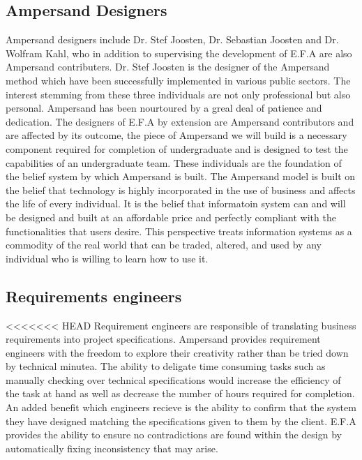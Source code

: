 \documentclass[12pt]{report}
\begin{document}
\subsection{Ampersand Designers}\label{subsec:Ampersand}
Ampersand designers include Dr. Stef Joosten, Dr. Sebastian Joosten and Dr. 
Wolfram Kahl, who in addition to supervising the development of E.F.A are also 
Ampersand contributers. Dr. Stef Joosten is the designer of the Ampersand 
method which have been successfully implemented in various public sectors. The 
interest stemming from these three individuals are not only professional but 
also personal. Ampersand has been nourtoured by a greal deal of patience and 
dedication. The designers of E.F.A by extension are Ampersand contributors and 
are affected by its outcome, the piece of Ampersand we will build is a 
necessary component required for completion of undergraduate and is designed to 
test the capabilities of an undergraduate team. 
These individuals are the foundation of the belief system by which Ampersand is 
built. The Ampersand model is built on the belief that technology is highly 
incorporated in the use of business and affects the life of every individual. 
It is the belief that informatoin system can and will be designed and built at 
an affordable price and perfectly compliant with the functionalities that users 
desire. This perspective treats information systems as a commodity of the real 
world that can be traded, altered, and used by any individual who is willing to 
learn how to use it.
\subsection{Requirements engineers}\label{subsec:BusReq}
<<<<<<< HEAD
Requirement engineers are responsible of translating business 
requirements into project specifications. Ampersand provides requirement 
engineers with the freedom to explore their creativity rather than be tried 
down by technical minutea. The ability to deligate time consuming tasks such as 
manually checking over technical specifications would increase the efficiency 
of the task at hand as well as decrease the number of hours required for 
completion. An added benefit which engineers recieve is the ability to confirm 
that the system they have designed matching the specifications given to them by 
the client. E.F.A provides the ability to ensure no contradictions are found 
within the design by automatically fixing inconsistency that may arise. 
\end{document}

